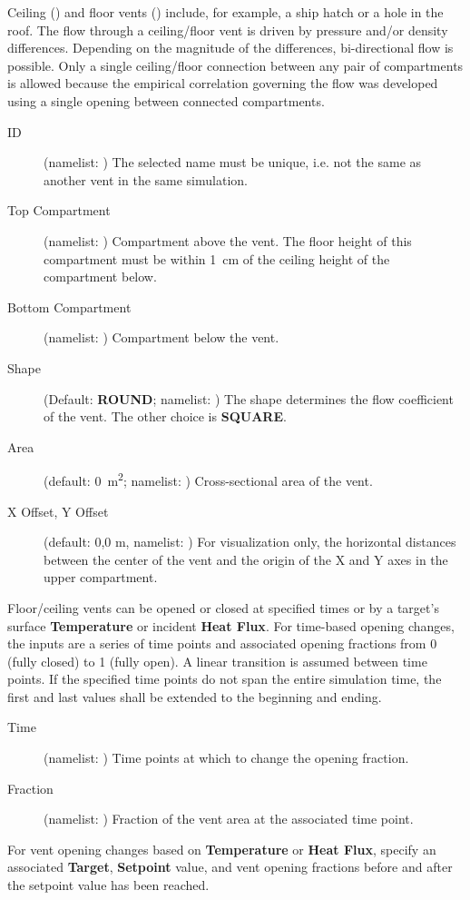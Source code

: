 {{Ceiling () and floor vents () include, for example, a ship hatch or a hole in the roof. The flow through a ceiling/floor vent is driven by pressure and/or density differences. Depending on the magnitude of the differences, bi-directional flow is possible. Only a single ceiling/floor connection between any pair of compartments is allowed because the empirical correlation governing the flow was developed using a single opening between connected compartments.
\begin{description}
\item[ID] (namelist: ) The selected name must be unique, i.e. not the same as another vent in the same simulation.
\item[Top Compartment] (namelist: ) Compartment above the vent. The floor height of this compartment must be within 1~cm of the ceiling height of the compartment below.
\item[Bottom Compartment] (namelist: ) Compartment below the vent.
\item[Shape] (Default: \textbf{ROUND}; namelist: ) The shape determines the flow coefficient of the vent. The other choice is \textbf{SQUARE}.
\item[Area] (default: 0~\unit{m^2}; namelist: ) Cross-sectional area of the vent.
\item[X Offset, Y Offset] (default: 0,0 m, namelist: ) For visualization only, the horizontal distances between the center of the vent and the origin of the X and Y axes in the upper compartment.
\end{description}
Floor/ceiling vents can be opened or closed at specified times or by a target's surface \textbf{Temperature} or incident \textbf{Heat Flux}. For time-based opening changes, the inputs are a series of time points and associated opening fractions from 0 (fully closed) to 1 (fully open). A linear transition is assumed between time points. If the specified time points do not span the entire simulation time, the first and last values shall be extended to the beginning and ending.
\begin{description}
\item[Time] (namelist: ) Time points at which to change the opening fraction.
\item[Fraction] (namelist: ) Fraction of the vent area at the associated time point.
\end{description}
For vent opening changes based on \textbf{Temperature} or \textbf{Heat Flux}, specify an associated \textbf{Target}, \textbf{Setpoint} value, and vent opening fractions before and after the setpoint value has been reached.



}}
